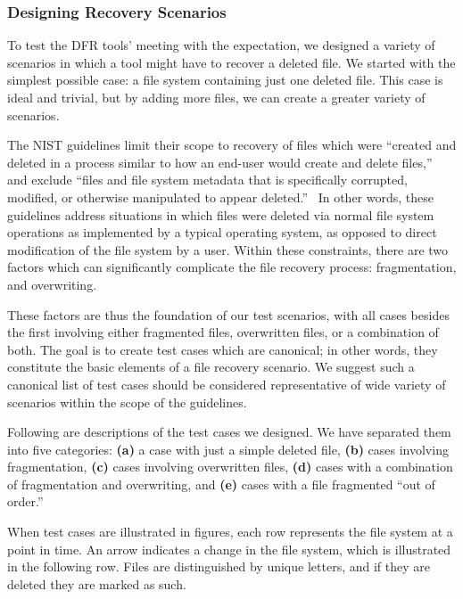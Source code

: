 \documentclass{ws-rv9x6}
\newenvironment{paraphrase}{\color{blue}}{\color{black}} %
\begin{document}
\subsubsection{Designing Recovery Scenarios}
\begin{paraphrase}
 To test the DFR tools' meeting with the expectation, we designed a variety of scenarios in which a tool might have to recover a deleted file. 
We started with the simplest possible case: a file system containing just one deleted file. 
This case is ideal and trivial, but by adding more files, we can create a greater variety of scenarios.

The NIST guidelines limit their scope to recovery of files which were ``created and deleted in a process similar to 
how an end-user would create and delete files,''~\cite{meta:dfr:standards} and exclude 
``files and file system metadata that is specifically corrupted, modified, or otherwise manipulated to appear deleted.''~\cite{meta:dfr:standards}
In other words, these guidelines address situations in which files were deleted via normal file system operations as 
implemented by a typical operating system, as opposed to direct modification of the file system by a user.
Within these constraints, there are two factors which can significantly complicate the file recovery process: 
fragmentation, and overwriting. 

These factors are thus the foundation of our test scenarios, with all cases besides the first involving either fragmented files, overwritten files, or a combination of both. 
The goal is to create test cases which are canonical; in other words, they constitute the basic elements of a file recovery scenario.
We suggest such a canonical list of test cases should be considered representative of wide variety of scenarios within the scope of the guidelines.

Following are descriptions of the test cases we designed. 
We have separated them into five categories: 
{\bf(a)} a case with just a simple deleted file, 
{\bf (b)} cases involving fragmentation,
{\bf (c)} cases involving overwritten files,
{\bf (d)} cases with a combination of fragmentation and overwriting,
and {\bf (e)} cases with a file fragmented ``out of order.''

When test cases are illustrated in figures, each row represents the file system at a point in time. An arrow indicates a change in the file system, which is illustrated in the following row. Files are distinguished by unique letters, and if they are deleted they are marked as such.


\end{paraphrase}
\end{document}

